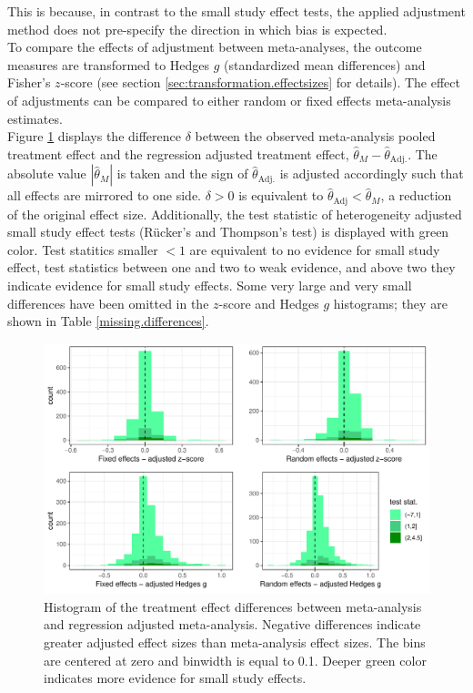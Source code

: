 \documentclass[11pt,a4paper,twoside]{book}\usepackage[]{graphicx}\usepackage[]{color}
\newenvironment{knitrout}{}{} %
\begin{document}
This is because, in contrast to the small study effect tests, the applied adjustment method does not pre-specify the direction in which bias is expected. \\
To compare the effects of adjustment between meta-analyses, the outcome measures are transformed to Hedges $g$ (standardized mean differences) and Fisher's $z$-score (see section \ref{sec:transformation.effectsizes} for details). The effect of adjustments can be compared to either random or fixed effects meta-analysis estimates. \\
Figure \ref{fig:adjustment.reg} displays the difference $\delta$ between the observed meta-analysis pooled treatment effect and the regression adjusted treatment effect, $\hat{\theta}_M - \hat{\theta}_\textrm{Adj.}$. The absolute value $|\hat{\theta}_M|$ is taken and the sign of $\hat{\theta}_\textrm{Adj.}$ is adjusted accordingly such that all effects are mirrored to one side. $\delta > 0$ is equivalent to $\hat{\theta}_\textrm{Adj} < \hat{\theta}_M$, a reduction of the original effect size. Additionally, the test statistic of heterogeneity adjusted small study effect tests (R\"ucker's and Thompson's test) is displayed with green color. Test statitics smaller $< 1$ are equivalent to no evidence for small study effect, test statistics between one and two to weak evidence, and above two they indicate evidence for small study effects. Some very large and very small differences have been omitted in the $z$-score and Hedges $g$ histograms; they are shown in Table \ref{missing.differences}. 

\begin{figure}
\begin{knitrout}
\color{fgcolor}

{\centering \includegraphics[width=\textwidth-3cm]{figure/ch03_figunnamed-chunk-16-1} 

}



\end{knitrout}
\caption{Histogram of the treatment effect differences between meta-analysis and regression adjusted meta-analysis. Negative differences indicate greater adjusted effect sizes than meta-analysis effect sizes. The bins are centered at zero and binwidth is equal to 0.1. Deeper green color indicates more evidence for small study effects.}
\label{fig:adjustment.reg}
\end{figure}
\end{document}
